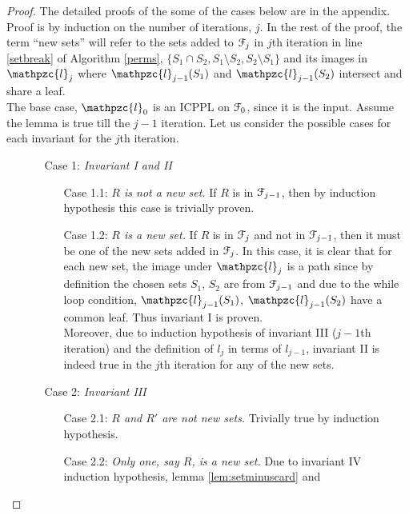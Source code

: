\documentclass[a4paper,UKenglish,numberwithinsect]{lipics}
\def\cF{{\cal F}}
\def\cl{\mathpzc{l}}
\begin{document}
\begin{proof}
The detailed proofs of the some of the cases below are in the appendix.
  Proof is by induction on the number of iterations, $j$. In the rest
  of the proof, the term ``new sets'' will refer to the sets added
  to $\cF_j$ in $j$th iteration in line \ref{setbreak} of Algorithm
  \ref{perms}, $\{S_1 \cap S_2, S_1 \setminus S_2, S_2 \setminus S_1
  \}$ and its images in $\cl_j$ where $\cl_{j-1}(S_1)$ and
  $\cl_{j-1}(S_2)$
  intersect and share a leaf.\\
  \noindent
  The base case, $\cl_0$ is an ICPPL on $\cF_0$, since it is the
  input.  Assume the lemma is true till the $j-1$ iteration. Let us consider
the possible cases for each invariant for the  $j$th  iteration.

  \noindent
  \begin{enumerate} %
  \item []
  \begin{enumerate}
  \item [Case 1:] {\em Invariant I and II} 
    \begin{enumerate}
    \item [Case 1.1:] {\em $R$ is not a new set.} If $R$ is in
      $\cF_{j-1}$, then by induction hypothesis this case is trivially
      proven.
    \item [Case 1.2:] {\em $R$ is a new set.} If $R$ is in $\cF_{j}$
      and not in $\cF_{j-1}$, then it must be one of the new sets
      added in $\cF_j$. In this case, it is clear that for each new
      set, the image under $\cl_j$ is a path since by definition the
      chosen sets $S_1$, $S_2$ are from $\cF_{j-1}$ and due to the
      while loop condition, $\cl_{j-1}(S_1)$, $\cl_{j-1}(S_2)$ have a
      common leaf. Thus invariant I is proven.\\
      Moreover, due to induction hypothesis of invariant III ($j-1$th
      iteration) and the definition of $l_j$ in terms of $l_{j-1}$,
      invariant II is indeed true in the $j$th iteration for any of
      the new sets.
   \end{enumerate}
  \item [Case 2:] {\em Invariant III}
    \begin{enumerate}
    \item [Case 2.1:] {\em $R$ and $R'$ are not new sets.} Trivially
      true by induction hypothesis.
    \item [Case 2.2:] {\em Only one, say $R$, is a new set.} Due to
  invariant IV induction hypothesis, lemma \ref{lem:setminuscard} and

\end{enumerate}
\end{enumerate}
\end{enumerate}
\end{proof}
\end{document}
